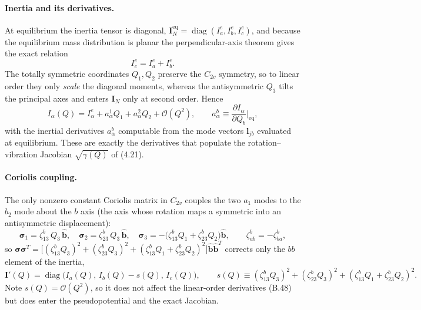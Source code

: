 \paragraph{Inertia and its derivatives.}
At equilibrium the inertia tensor is diagonal, $\mathbf I_N^{\mathrm{eq}}=\operatorname{diag}(I_a^{e},I_b^{e},I_c^{e})$, and because the equilibrium mass distribution is planar the perpendicular-axis theorem gives the exact relation
\begin{equation}
I_c^{e}=I_a^{e}+I_b^{e}. \tag{B.47}
\end{equation}
The totally symmetric coordinates $Q_1,Q_2$ preserve the $C_{2v}$ symmetry, so to linear order they only \emph{scale} the diagonal moments, whereas the antisymmetric $Q_3$ tilts the principal axes and enters $\mathbf I_N$ only at second order. Hence
\begin{equation}
I_\alpha(Q)=I_\alpha^{e}+a_\alpha^{1}Q_1+a_\alpha^{2}Q_2+\mathcal O(Q^2),
\qquad a_\alpha^{b}\equiv\frac{\partial I_\alpha}{\partial Q_b}\Big|_{\mathrm{eq}}, \tag{B.48}
\end{equation}
with the inertial derivatives $a_\alpha^{b}$ computable from the mode vectors $\mathbf l_{jb}$ evaluated at equilibrium. These are exactly the derivatives that populate the rotation--vibration Jacobian $\sqrt{\gamma(Q)}$ of (4.21).

\paragraph{Coriolis coupling.}
The only nonzero constant Coriolis matrix in $C_{2v}$ couples the two $a_1$ modes to the $b_2$ mode about the $b$ axis (the axis whose rotation maps a symmetric into an antisymmetric displacement):
\begin{equation}
\boldsymbol\sigma_1=\zeta^{b}_{13}\,Q_3\,\hat{\mathbf b},\quad
\boldsymbol\sigma_2=\zeta^{b}_{23}\,Q_3\,\hat{\mathbf b},\quad
\boldsymbol\sigma_3=-\bigl(\zeta^{b}_{13}Q_1+\zeta^{b}_{23}Q_2\bigr)\hat{\mathbf b},
\qquad \zeta^{b}_{ab}=-\zeta^{b}_{ba}, \tag{B.49}
\end{equation}
so $\boldsymbol\sigma\boldsymbol\sigma^{T}=\bigl[(\zeta^{b}_{13}Q_3)^2+(\zeta^{b}_{23}Q_3)^2+(\zeta^{b}_{13}Q_1+\zeta^{b}_{23}Q_2)^2\bigr]\hat{\mathbf b}\hat{\mathbf b}^{T}$ corrects only the $bb$ element of the inertia,
\begin{equation}
\mathbf I'(Q)=\operatorname{diag}\!\bigl(I_a(Q),\,I_b(Q)-s(Q),\,I_c(Q)\bigr),\qquad
s(Q)\equiv(\zeta^{b}_{13}Q_3)^2+(\zeta^{b}_{23}Q_3)^2+(\zeta^{b}_{13}Q_1+\zeta^{b}_{23}Q_2)^2 . \tag{B.50}
\end{equation}
Note $s(Q)=\mathcal O(Q^2)$, so it does not affect the linear-order derivatives (B.48) but does enter the pseudopotential and the exact Jacobian.

